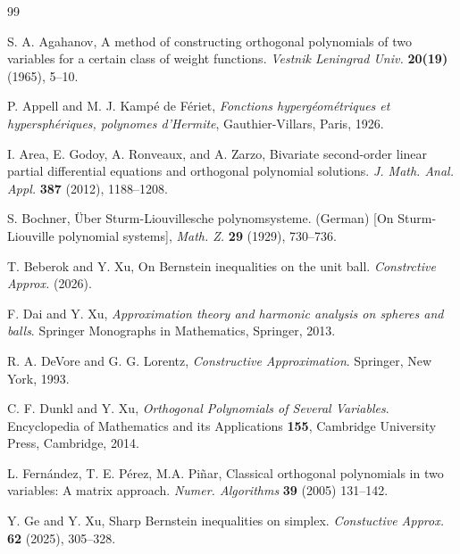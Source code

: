 \documentclass{amsart}
\theoremstyle{remark}
\begin{document}
\begin{thebibliography}{99}

      S. A. Agahanov, 
      A method of constructing orthogonal polynomials of two variables for a certain class of weight functions.
      \textit{Vestnik Leningrad Univ.} \textbf{20(19)} (1965), 5--10.
       
      P. Appell and M. J. Kamp\'e de F\'eriet,  
      \textit{Fonctions hyperg\'eom\'etriques et hypersph\'eriques, polynomes d'Hermite}, 
      Gauthier-Villars, Paris, 1926.

       I. Area, E. Godoy, A. Ronveaux, and A. Zarzo,
       Bivariate second-order linear partial differential equations and orthogonal polynomial solutions. 
       \textit{J. Math. Anal. Appl. } \textbf{387} (2012), 1188--1208.  

        
        S. Bochner, \"Uber Sturm-Liouvillesche polynomsysteme. (German) 
        [On Sturm-Liouville polynomial systems], 
        \textit{Math. Z.} \textbf{29} (1929), 730--736. 

        T. Beberok and Y. Xu,
        On Bernstein inequalities on the unit ball. 
        \textit{Constrctive Approx.} (2026).  

        F. Dai and Y. Xu,
        \textit{Approximation theory and harmonic analysis on spheres and balls}.
        Springer Monographs in Mathematics, Springer, 2013.  
         
        R. A. DeVore and G. G. Lorentz, 
        {\it Constructive Approximation}. Springer, New York, 1993.

        C. F. Dunkl and Y. Xu,
        \textit{Orthogonal Polynomials of Several Variables}.
        Encyclopedia of Mathematics and its Applications \textbf{155},
        Cambridge University Press, Cambridge, 2014.
 
        L. Fern\'andez, T. E. P\'erez, M.A. Pi\~nar, 
        Classical orthogonal polynomials in two variables: A matrix approach.  
        \textit{Numer. Algorithms} \textbf{39} (2005) 131--142.

        Y. Ge and Y. Xu, 
        Sharp Bernstein inequalities on simplex. 
        \textit{Constuctive Approx.} \textbf{62} (2025), 305--328.        
           

\end{thebibliography}
\end{document}
